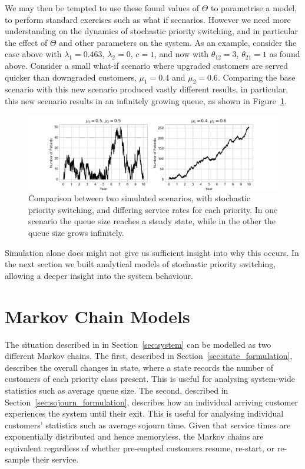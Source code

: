 \documentclass{article}
\begin{document}
We may then be tempted to use these found values of $\Theta$ to parametrise a
model, to perform standard exercises such as what if scenarios. However we need
more understanding on the dynamics of stochastic priority switching, and in
particular the effect of $\Theta$ and other parameters on the system. As an 
example, consider the case above with $\lambda_1 = 0.463$, $\lambda_2 = 0$,
$c = 1$, and now with $\theta_{12}=3$, $\theta_{21}=1$ as found above. Consider
a small what-if scenario where upgraded customers are served quicker than
downgraded customers, $\mu_1 = 0.4$ and $\mu_2 = 0.6$. Comparing the base
scenario with this new scenario produced vastly different results, in
particular, this new scenario results in an infinitely growing queue, as shown
in Figure~\ref{fig:toy_scenario}.

\begin{figure}
  \begin{center}
    \includegraphics[width=\textwidth]{img/adjust_service_rate.pdf}
  \end{center}
  \caption{Comparison between two simulated scenarios, with stochastic priority
  switching, and differing service rates for each priority. In one scenario the
  queue size reaches a steady state, while in the other the queue size grows
  infinitely.}
  \label{fig:toy_scenario}
\end{figure}

Simulation alone does might not give us sufficient insight into why this occurs.
In the next section we built analytical models of stochastic priority switching,
allowing a deeper insight into the system behaviour.


\section{Markov Chain Models}\label{sec:makovchains}
The situation described in in Section~\ref{sec:system} can be modelled as two
different Markov chains.
The first, described in Section~\ref{sec:state_formulation}, describes the
overall changes in state, where a state records the number of customers of each
priority class present. This is useful for analysing system-wide statistics such
as average queue size.
The second, described in Section~\ref{sec:sojourn_formulation}, describes how an
individual arriving customer experiences the system until their exit. This is
useful for analysing individual customers' statistics such as average sojourn
time.
Given that service times are exponentially distributed and hence memoryless, the
Markov chains are equivalent regardless of whether pre-empted customers resume,
re-start, or re-sample their service.
\end{document}
